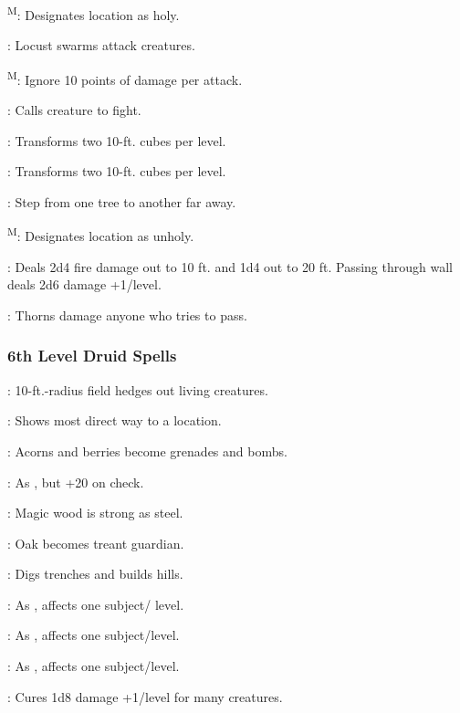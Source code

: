 \textsuperscript{M}: Designates location as holy.

: Locust swarms attack creatures.

\textsuperscript{M}: Ignore 10 points of damage per attack.

: Calls creature to fight.

: Transforms two 10-ft. cubes per level.

: Transforms two 10-ft. cubes per level.

: Step from one tree to another far away.

\textsuperscript{M}: Designates location as unholy.

: Deals 2d4 fire damage out to 10 ft. and 1d4 out to 20 ft. 
Passing through wall deals 2d6 damage +1/level.

: Thorns damage anyone who tries to pass.

\subsubsection{6th Level Druid Spells}

: 10-ft.-radius field hedges out living creatures.

: Shows most direct way to a location.

: Acorns and berries become grenades and bombs.

: As , but +20 on check.

: Magic wood is strong as steel.

: Oak becomes treant guardian.

: Digs trenches and builds hills.

: As , affects one subject/ level.

: As , affects one subject/level.

: As , affects one subject/level.

: Cures 1d8 damage +1/level for many creatures.

